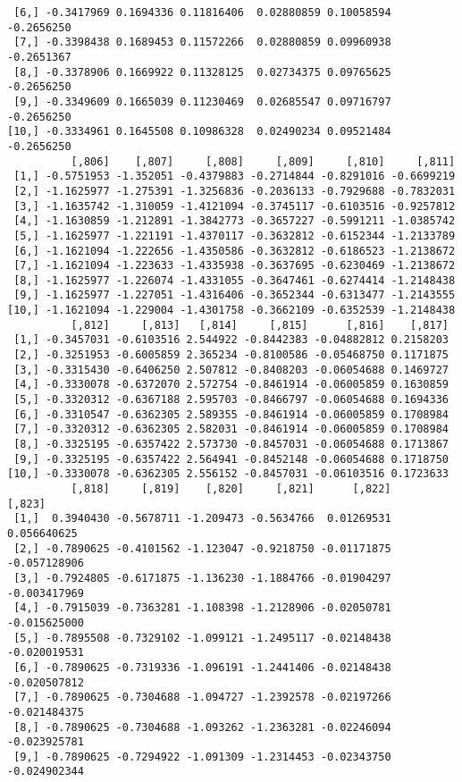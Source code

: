 \documentclass[
  letterpaper,
  DIV=11,
  numbers=noendperiod]{scrreprt}
\begin{document}
\begin{verbatim}
 [6,] -0.3417969 0.1694336 0.11816406  0.02880859 0.10058594 -0.2656250
 [7,] -0.3398438 0.1689453 0.11572266  0.02880859 0.09960938 -0.2651367
 [8,] -0.3378906 0.1669922 0.11328125  0.02734375 0.09765625 -0.2656250
 [9,] -0.3349609 0.1665039 0.11230469  0.02685547 0.09716797 -0.2656250
[10,] -0.3334961 0.1645508 0.10986328  0.02490234 0.09521484 -0.2656250
          [,806]    [,807]     [,808]     [,809]     [,810]     [,811]
 [1,] -0.5751953 -1.352051 -0.4379883 -0.2714844 -0.8291016 -0.6699219
 [2,] -1.1625977 -1.275391 -1.3256836 -0.2036133 -0.7929688 -0.7832031
 [3,] -1.1635742 -1.310059 -1.4121094 -0.3745117 -0.6103516 -0.9257812
 [4,] -1.1630859 -1.212891 -1.3842773 -0.3657227 -0.5991211 -1.0385742
 [5,] -1.1625977 -1.221191 -1.4370117 -0.3632812 -0.6152344 -1.2133789
 [6,] -1.1621094 -1.222656 -1.4350586 -0.3632812 -0.6186523 -1.2138672
 [7,] -1.1621094 -1.223633 -1.4335938 -0.3637695 -0.6230469 -1.2138672
 [8,] -1.1625977 -1.226074 -1.4331055 -0.3647461 -0.6274414 -1.2148438
 [9,] -1.1625977 -1.227051 -1.4316406 -0.3652344 -0.6313477 -1.2143555
[10,] -1.1621094 -1.229004 -1.4301758 -0.3662109 -0.6352539 -1.2148438
          [,812]     [,813]   [,814]     [,815]      [,816]    [,817]
 [1,] -0.3457031 -0.6103516 2.544922 -0.8442383 -0.04882812 0.2158203
 [2,] -0.3251953 -0.6005859 2.365234 -0.8100586 -0.05468750 0.1171875
 [3,] -0.3315430 -0.6406250 2.507812 -0.8408203 -0.06054688 0.1469727
 [4,] -0.3330078 -0.6372070 2.572754 -0.8461914 -0.06005859 0.1630859
 [5,] -0.3320312 -0.6367188 2.595703 -0.8466797 -0.06054688 0.1694336
 [6,] -0.3310547 -0.6362305 2.589355 -0.8461914 -0.06005859 0.1708984
 [7,] -0.3320312 -0.6362305 2.582031 -0.8461914 -0.06005859 0.1708984
 [8,] -0.3325195 -0.6357422 2.573730 -0.8457031 -0.06054688 0.1713867
 [9,] -0.3325195 -0.6357422 2.564941 -0.8452148 -0.06054688 0.1718750
[10,] -0.3330078 -0.6362305 2.556152 -0.8457031 -0.06103516 0.1723633
          [,818]     [,819]    [,820]     [,821]      [,822]       [,823]
 [1,]  0.3940430 -0.5678711 -1.209473 -0.5634766  0.01269531  0.056640625
 [2,] -0.7890625 -0.4101562 -1.123047 -0.9218750 -0.01171875 -0.057128906
 [3,] -0.7924805 -0.6171875 -1.136230 -1.1884766 -0.01904297 -0.003417969
 [4,] -0.7915039 -0.7363281 -1.108398 -1.2128906 -0.02050781 -0.015625000
 [5,] -0.7895508 -0.7329102 -1.099121 -1.2495117 -0.02148438 -0.020019531
 [6,] -0.7890625 -0.7319336 -1.096191 -1.2441406 -0.02148438 -0.020507812
 [7,] -0.7890625 -0.7304688 -1.094727 -1.2392578 -0.02197266 -0.021484375
 [8,] -0.7890625 -0.7304688 -1.093262 -1.2363281 -0.02246094 -0.023925781
 [9,] -0.7890625 -0.7294922 -1.091309 -1.2314453 -0.02343750 -0.024902344

\end{verbatim}
\end{document}
